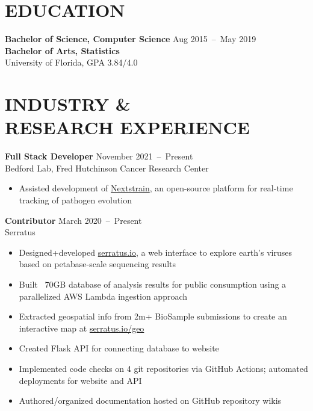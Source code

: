 \documentclass[line,resmargin]{res}
\begin{document}
\address{\href{mailto:victor@victorl.in}{victor@victorl.in} $|$
         \href{https://victorl.in/}{https://victorl.in/}}

\begin{resume}

\section{EDUCATION}
    \textbf{Bachelor of Science, Computer Science}    \hfill Aug 2015~--~May 2019 \\
    \textbf{Bachelor of Arts, Statistics} \\
    University of Florida, GPA 3.84/4.0

\section{INDUSTRY \& \\ RESEARCH EXPERIENCE}
    \textbf{Full Stack Developer}    \hfill November 2021~--~Present \\
    Bedford Lab, Fred Hutchinson Cancer Research Center
    \begin{itemize}  \itemsep -2pt
        \item Assisted development of \href{https://nextstrain.org/}{Nextstrain}, an open-source platform for real-time tracking of pathogen evolution
    \end{itemize}

    \textbf{Contributor}    \hfill March 2020~--~Present \\
    Serratus
    \begin{itemize}  \itemsep -2pt
        \item Designed+developed \href{https://serratus.io/}{serratus.io}, a web interface to explore earth's viruses based on petabase-scale sequencing results
        \item Built ~70GB database of analysis results for public consumption using a parallelized AWS Lambda ingestion approach
        \item Extracted geospatial info from 2m+ BioSample submissions to create an interactive map at \href{https://serratus.io/geo}{serratus.io/geo}
        \item Created Flask API for connecting database to website
        \item Implemented code checks on 4 git repositories via GitHub Actions; automated deployments for website and API
        \item Authored/organized documentation hosted on GitHub repository wikis
    \end{itemize}


\end{resume}
\end{document}
